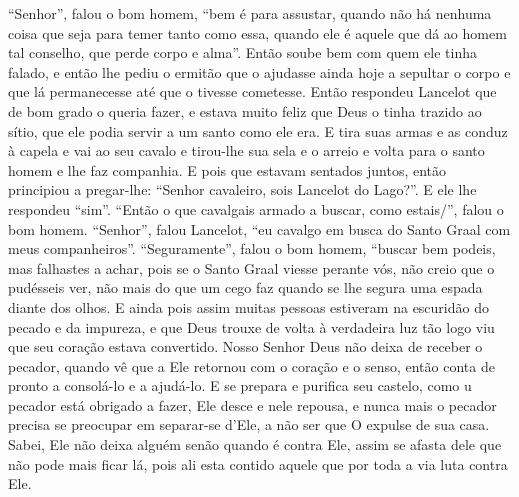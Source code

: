 “Senhor”, falou o bom homem, “bem é para assustar, quando não há nenhuma
coisa que seja para temer tanto como essa, quando ele é aquele que dá ao homem
tal conselho, que perde corpo e alma”. Então soube bem com quem ele
tinha falado, e então lhe pediu o ermitão que o ajudasse ainda hoje a sepultar
o corpo e que lá permanecesse até que o tivesse cometesse. Então respondeu
Lancelot que de bom grado o queria fazer, e estava muito feliz que Deus o
tinha trazido ao sítio, que ele podia servir a um santo como ele era. E tira
suas armas e as conduz à capela e vai ao seu cavalo e tirou-lhe sua sela e o
arreio e volta para o santo homem e lhe faz companhia. E pois que estavam
sentados juntos, então principiou a pregar-lhe: “Senhor cavaleiro, sois
Lancelot do Lago?”. E ele lhe respondeu “sim”. “Então o que cavalgais armado a
buscar, como estais/”, falou o bom homem. “Senhor”, falou Lancelot, “eu
cavalgo em busca do Santo Graal com meus companheiros”. “Seguramente”, falou o
bom homem, “buscar bem podeis, mas falhastes a achar, pois se o Santo Graal
viesse perante vós, não creio que o pudésseis ver, não mais do que um cego faz
quando se lhe segura uma espada diante dos olhos. E ainda pois assim muitas
pessoas estiveram na escuridão do pecado e da impureza, e que Deus trouxe de
volta à verdadeira luz tão logo viu que seu coração estava convertido. Nosso
Senhor Deus não deixa de receber o pecador, quando vê que a Ele retornou com o
coração e o senso, então conta de pronto a consolá-lo e a ajudá-lo. E se
prepara e purifica seu castelo, como u pecador está obrigado a fazer, Ele desce
e nele repousa, e nunca mais o pecador precisa se preocupar em separar-se
d’Ele, a não ser que O expulse de sua casa. Sabei, Ele não deixa alguém senão
quando é contra Ele, assim se afasta dele que não pode mais ficar lá, pois ali
esta contido aquele que por toda a via luta contra Ele.

